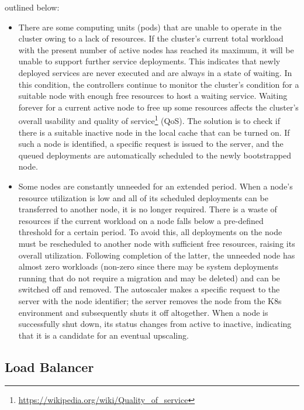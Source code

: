 outlined below:
\begin{itemize}
  \item There are some computing units (pods) that are unable to operate in the cluster
    owing to a lack of resources.
    \newline
    If the cluster's current total workload with the present number of active
    nodes has reached its maximum, it will be unable to support further service deployments.
    This indicates that newly deployed services are never executed and are
    always in a state of waiting. In this condition, the controllers continue to
    monitor the cluster's condition for a suitable node with enough free
    resources to host a waiting service. Waiting forever for a current active node
    to free up some resources affects the cluster's overall usability and quality
    of service\footnote{\url{https://wikipedia.org/wiki/Quality_of_service}} (QoS).
    The solution is to check if there is a suitable inactive node in the local
    cache that can be turned on. If such a node is identified, a specific
    request is issued to the server, and the queued deployments are automatically
    scheduled to the newly bootstrapped node.

  \item Some nodes are constantly unneeded for an extended period. When a node's
    resource utilization is low and all of its scheduled deployments can be
    transferred to another node, it is no longer required.
    \newline
    There is a waste of resources if the current workload on a node falls below
    a pre-defined threshold for a certain period. To avoid this, all deployments
    on the node must be rescheduled to another node with sufficient free
    resources, raising its overall utilization. Following completion of the
    latter, the unneeded node has almost zero workloads (non-zero since there
    may be system deployments running that do not require a migration and may be
    deleted) and can be switched off and removed. The autoscaler makes a
    specific request to the server with the node identifier; the server removes the
    node from the K8s environment and subsequently shuts it off altogether. When
    a node is successfully shut down, its status changes from active to inactive,
    indicating that it is a candidate for an eventual upscaling.
\end{itemize}

\subsection{Load Balancer}
\label{subsec:architecture_components_load_balancer}

